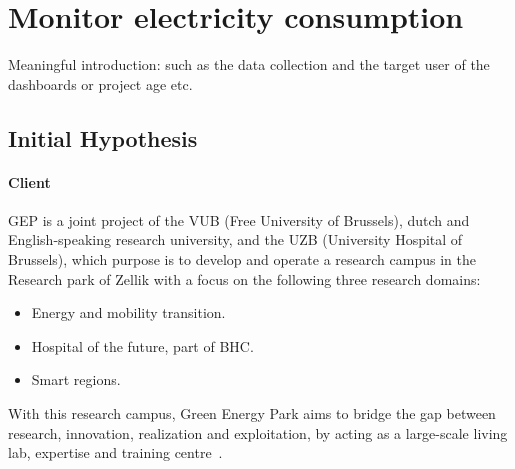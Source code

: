 \section{Monitor electricity consumption}
Meaningful introduction:
such as the data collection and the target user of the dashboards or project age etc.

\subsection{Initial Hypothesis}\label{sub:vub_initial_hp}
\paragraph{Client} 
\ac{GEP} is a joint project of the \ac{VUB} (Free University of Brussels), dutch and English-speaking research university, and the \ac{UZB} (University Hospital of Brussels), 
which purpose is to develop and operate a research campus in the Research park of Zellik with a focus on the following three research domains:
\begin{itemize}
    \item Energy and mobility transition.
    \item Hospital of the future, part of \ac{BHC}.
    \item Smart regions.
\end{itemize}
With this research campus, Green Energy Park aims to bridge the gap between research, innovation, realization and exploitation, by acting as a large-scale living lab, expertise and training centre~\cite{Misc:vub_2020_green}.
